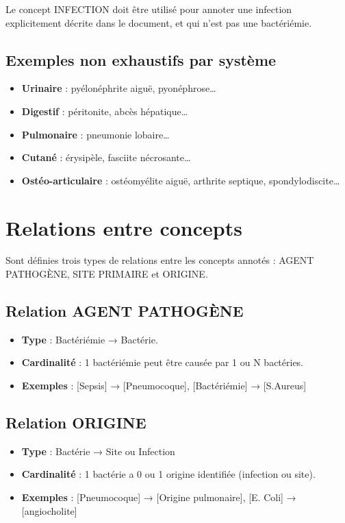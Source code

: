 Le concept INFECTION doit être utilisé pour annoter une infection explicitement décrite dans le document, et qui n'est pas une bactériémie.

\subsection{Exemples non exhaustifs par système}

\begin{itemize}
    \item \textbf{Urinaire} : pyélonéphrite aiguë, pyonéphrose\ldots
    \item \textbf{Digestif} : péritonite, abcès hépatique\ldots
    \item \textbf{Pulmonaire} : pneumonie lobaire\ldots
    \item \textbf{Cutané} : érysipèle, fasciite nécrosante\ldots
    \item \textbf{Ostéo-articulaire} : ostéomyélite aiguë, arthrite septique, spondylodiscite\ldots
\end{itemize}

\section{Relations entre concepts}

Sont définies trois types de relations entre les concepts annotés : AGENT PATHOGÈNE, SITE PRIMAIRE et ORIGINE.

\subsection{Relation AGENT PATHOGÈNE}

\begin{itemize}
    \item \textbf{Type} : Bactériémie → Bactérie.
    \item \textbf{Cardinalité} : 1 bactériémie peut être causée par 1 ou N bactéries.
    \item \textbf{Exemples} : [Sepsis] → [Pneumocoque], [Bactériémie] → [S.Aureus]
\end{itemize}

\subsection{Relation ORIGINE}

\begin{itemize}
    \item \textbf{Type} : Bactérie → Site ou Infection
    \item \textbf{Cardinalité} : 1 bactérie a 0 ou 1 origine identifiée (infection ou site).
    \item \textbf{Exemples} : [Pneumocoque] → [Origine pulmonaire], [E. Coli] → [angiocholite]
\end{itemize}

